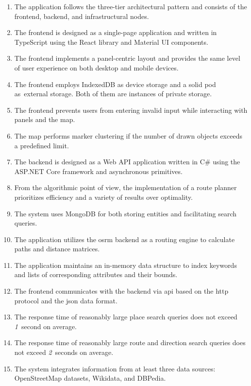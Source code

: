 \begin{enumerate}[label=\textbf{N\arabic*}]
\item The application follows the three-tier architectural pattern and consists of the frontend, backend, and infrastructural nodes.
\item The frontend is designed as a single-page application and written in TypeScript using the React library and Material UI components.
\item The frontend implements a panel-centric layout and provides the same level of user experience on both desktop and mobile devices.
\item\label{itm:q-solid-indexeddb} The frontend employs IndexedDB as device storage and a \acs{solid} pod as~ex\-ter\-nal storage. Both of them are instances of private storage.
\item The frontend prevents users from entering invalid input while interacting with panels and the map.
\item The map performs marker clustering if the number of drawn objects exceeds a predefined limit.
\item The backend is designed as a Web API application written in C\# using the ASP.NET Core framework and asynchronous primitives.
\item\label{itm:q-efficiency-variety} From the algorithmic point of view, the implementation of a route planner prioritizes efficiency and a variety of results over optimality.
\item The system uses MongoDB for both storing entities and facilitating search queries.
\item The application utilizes the \acs{osrm} backend as a routing engine to calculate paths and distance matrices.
\item The application maintains an in-memory data structure to index keywords and lists of corresponding attributes and their bounds.
\item The frontend communicates with the backend via \acs{api} based on the \acs{http} protocol and the \acs{json} data format.
\item\label{itm:q-response-time-places} The response time of reasonably large place search queries does not exceed \emph{1}~second on average.
\item\label{itm:q-response-time-routes} The response time of reasonably large route and direction search queries does not exceed \emph{2}~seconds on average.
\item The system integrates information from at least three data sources: OpenStreetMap datasets, Wikidata, and DBPedia.

\end{enumerate}
